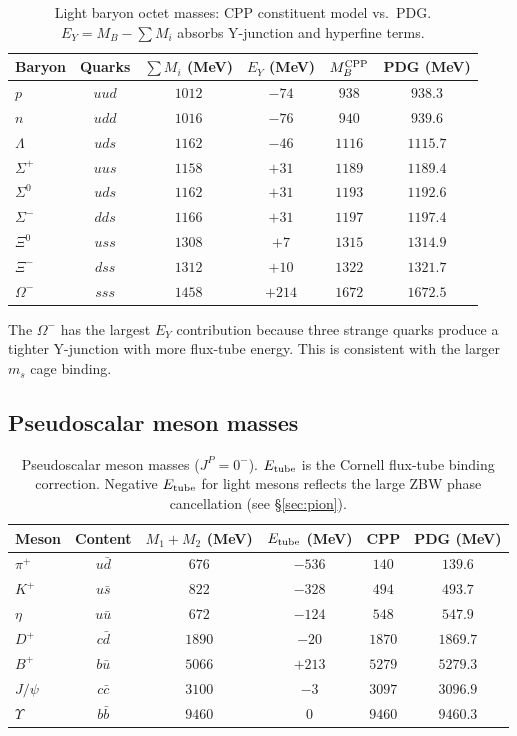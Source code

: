 \documentclass[11pt,a4paper]{article}
\begin{document}
\begin{table}[H]
\centering
\caption{Light baryon octet masses: CPP constituent model vs.\ PDG.
  $E_Y = M_B - \sum M_i$ absorbs Y-junction and hyperfine terms.}
\label{tab:baryons}
\begin{tabular}{@{}lccccc@{}}
\toprule
Baryon & Quarks & $\sum M_i$ (MeV) & $E_Y$ (MeV) & $M_B^{\rm CPP}$ & PDG (MeV) \\
\midrule
$p$         & $uud$ & $1012$ & $-74$ & $938$ & $938.3$ \\
$n$         & $udd$ & $1016$ & $-76$ & $940$ & $939.6$ \\
$\Lambda$   & $uds$ & $1162$ & $-46$ & $1116$ & $1115.7$ \\
$\Sigma^+$  & $uus$ & $1158$ & $+31$ & $1189$ & $1189.4$ \\
$\Sigma^0$  & $uds$ & $1162$ & $+31$ & $1193$ & $1192.6$ \\
$\Sigma^-$  & $dds$ & $1166$ & $+31$ & $1197$ & $1197.4$ \\
$\Xi^0$     & $uss$ & $1308$ & $+7$  & $1315$ & $1314.9$ \\
$\Xi^-$     & $dss$ & $1312$ & $+10$ & $1322$ & $1321.7$ \\
$\Omega^-$  & $sss$ & $1458$ & $+214$& $1672$ & $1672.5$ \\
\bottomrule
\end{tabular}
\end{table}

The $\Omega^-$ has the largest $E_Y$ contribution because three
strange quarks produce a tighter Y-junction with more flux-tube
energy.  This is consistent with the larger $m_s$ cage binding.

\subsection{Pseudoscalar meson masses}

\begin{table}[H]
\centering
\caption{Pseudoscalar meson masses ($J^P = 0^-$).
  $E_{\rm tube}$ is the Cornell flux-tube binding correction.
  Negative $E_{\rm tube}$ for light mesons reflects the large
  ZBW phase cancellation (see \S\ref{sec:pion}).}
\label{tab:mesons_ps}
\begin{tabular}{@{}lccccc@{}}
\toprule
Meson & Content & $M_1+M_2$ (MeV) & $E_{\rm tube}$ (MeV) & CPP & PDG (MeV) \\
\midrule
$\pi^+$  & $u\bar{d}$ & $676$  & $-536$ & $140$   & $139.6$ \\
$K^+$    & $u\bar{s}$ & $822$  & $-328$ & $494$   & $493.7$ \\
$\eta$   & $u\bar{u}$ & $672$  & $-124$ & $548$   & $547.9$ \\
$D^+$    & $c\bar{d}$ & $1890$ & $-20$  & $1870$  & $1869.7$ \\
$B^+$    & $b\bar{u}$ & $5066$ & $+213$ & $5279$  & $5279.3$ \\
$J/\psi$ & $c\bar{c}$ & $3100$ & $-3$   & $3097$  & $3096.9$ \\
$\Upsilon$& $b\bar{b}$& $9460$ & $0$    & $9460$  & $9460.3$ \\
\bottomrule
\end{tabular}
\end{table}
\end{document}
